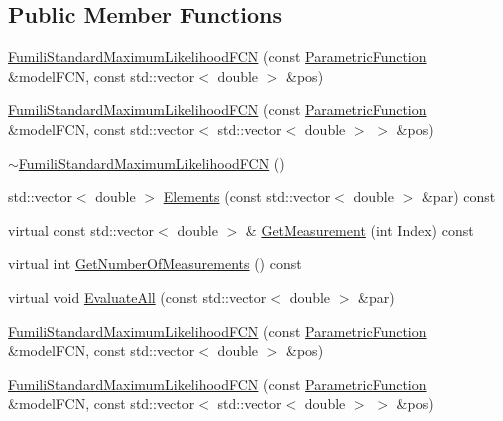 \subsection*{Public Member Functions}
\begin{DoxyCompactItemize}
\item 
\mbox{\hyperlink{classROOT_1_1Minuit2_1_1FumiliStandardMaximumLikelihoodFCN_af7dc80571b509a0a4f2f7ef821c3b1e6}{Fumili\+Standard\+Maximum\+Likelihood\+F\+CN}} (const \mbox{\hyperlink{classROOT_1_1Minuit2_1_1ParametricFunction}{Parametric\+Function}} \&model\+F\+CN, const std\+::vector$<$ double $>$ \&pos)
\item 
\mbox{\hyperlink{classROOT_1_1Minuit2_1_1FumiliStandardMaximumLikelihoodFCN_af233ad0d9ef029dd8aa6a145ea991483}{Fumili\+Standard\+Maximum\+Likelihood\+F\+CN}} (const \mbox{\hyperlink{classROOT_1_1Minuit2_1_1ParametricFunction}{Parametric\+Function}} \&model\+F\+CN, const std\+::vector$<$ std\+::vector$<$ double $>$ $>$ \&pos)
\item 
\mbox{\hyperlink{classROOT_1_1Minuit2_1_1FumiliStandardMaximumLikelihoodFCN_aa43a2e65c5083814ee9a08ee51f6abd5}{$\sim$\+Fumili\+Standard\+Maximum\+Likelihood\+F\+CN}} ()
\item 
std\+::vector$<$ double $>$ \mbox{\hyperlink{classROOT_1_1Minuit2_1_1FumiliStandardMaximumLikelihoodFCN_a19866fac44787dee8e2a6a35e7a15fe1}{Elements}} (const std\+::vector$<$ double $>$ \&par) const
\item 
virtual const std\+::vector$<$ double $>$ \& \mbox{\hyperlink{classROOT_1_1Minuit2_1_1FumiliStandardMaximumLikelihoodFCN_a6eb1fbf9c0c13057e080f8ed7af7a1c2}{Get\+Measurement}} (int Index) const
\item 
virtual int \mbox{\hyperlink{classROOT_1_1Minuit2_1_1FumiliStandardMaximumLikelihoodFCN_a09175207d6c0ed94898f3985b4d376d2}{Get\+Number\+Of\+Measurements}} () const
\item 
virtual void \mbox{\hyperlink{classROOT_1_1Minuit2_1_1FumiliStandardMaximumLikelihoodFCN_a1faea776f7da3c238e522748b573caab}{Evaluate\+All}} (const std\+::vector$<$ double $>$ \&par)
\item 
\mbox{\hyperlink{classROOT_1_1Minuit2_1_1FumiliStandardMaximumLikelihoodFCN_af7dc80571b509a0a4f2f7ef821c3b1e6}{Fumili\+Standard\+Maximum\+Likelihood\+F\+CN}} (const \mbox{\hyperlink{classROOT_1_1Minuit2_1_1ParametricFunction}{Parametric\+Function}} \&model\+F\+CN, const std\+::vector$<$ double $>$ \&pos)
\item 
\mbox{\hyperlink{classROOT_1_1Minuit2_1_1FumiliStandardMaximumLikelihoodFCN_af233ad0d9ef029dd8aa6a145ea991483}{Fumili\+Standard\+Maximum\+Likelihood\+F\+CN}} (const \mbox{\hyperlink{classROOT_1_1Minuit2_1_1ParametricFunction}{Parametric\+Function}} \&model\+F\+CN, const std\+::vector$<$ std\+::vector$<$ double $>$ $>$ \&pos)

\end{DoxyCompactItemize}
